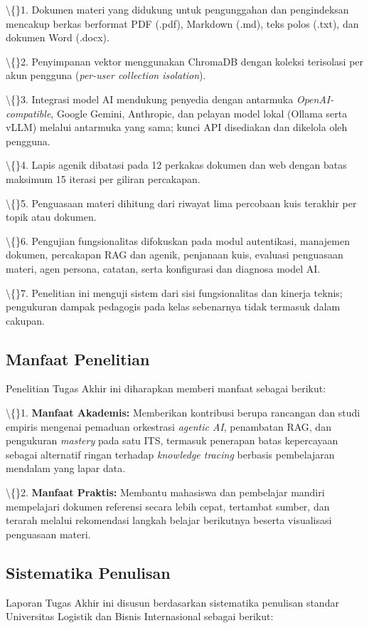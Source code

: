 \documentclass[12pt,a4paper]{article}
\begin{document}
\textbackslash\{\}1. Dokumen materi yang didukung untuk pengunggahan dan pengindeksan mencakup berkas berformat PDF (.pdf), Markdown (.md), teks polos (.txt), dan dokumen Word (.docx).

\textbackslash\{\}2. Penyimpanan vektor menggunakan ChromaDB dengan koleksi terisolasi per akun pengguna (\textit{per-user collection isolation}).

\textbackslash\{\}3. Integrasi model AI mendukung penyedia dengan antarmuka \textit{OpenAI-compatible}, Google Gemini, Anthropic, dan pelayan model lokal (Ollama serta vLLM) melalui antarmuka yang sama; kunci API disediakan dan dikelola oleh pengguna.

\textbackslash\{\}4. Lapis agenik dibatasi pada 12 perkakas dokumen dan web dengan batas maksimum 15 iterasi per giliran percakapan.

\textbackslash\{\}5. Penguasaan materi dihitung dari riwayat lima percobaan kuis terakhir per topik atau dokumen.

\textbackslash\{\}6. Pengujian fungsionalitas difokuskan pada modul autentikasi, manajemen dokumen, percakapan RAG dan agenik, penjanaan kuis, evaluasi penguasaan materi, agen persona, catatan, serta konfigurasi dan diagnosa model AI.

\textbackslash\{\}7. Penelitian ini menguji sistem dari sisi fungsionalitas dan kinerja teknis; pengukuran dampak pedagogis pada kelas sebenarnya tidak termasuk dalam cakupan.

\subsection*{Manfaat Penelitian}
Penelitian Tugas Akhir ini diharapkan memberi manfaat sebagai berikut:

\textbackslash\{\}1. \textbf{Manfaat Akademis:} Memberikan kontribusi berupa rancangan dan studi empiris mengenai pemaduan orkestrasi \textit{agentic AI}, penambatan RAG, dan pengukuran \textit{mastery} pada satu ITS, termasuk penerapan batas kepercayaan sebagai alternatif ringan terhadap \textit{knowledge tracing} berbasis pembelajaran mendalam yang lapar data.

\textbackslash\{\}2. \textbf{Manfaat Praktis:} Membantu mahasiswa dan pembelajar mandiri mempelajari dokumen referensi secara lebih cepat, tertambat sumber, dan terarah melalui rekomendasi langkah belajar berikutnya beserta visualisasi penguasaan materi.

\subsection*{Sistematika Penulisan}
Laporan Tugas Akhir ini disusun berdasarkan sistematika penulisan standar Universitas Logistik dan Bisnis Internasional sebagai berikut:
\end{document}
